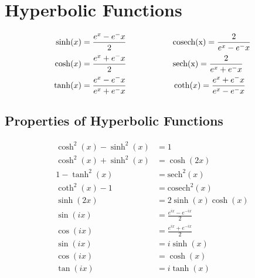 \section{Hyperbolic Functions}
\begin{align*}
\sinh(x) &= \frac{e^x - e^-x}{2} \hspace{20mm} \mathrm{cosech(x)} = \frac{2}{e^x - e^-x}\\
\cosh(x) &= \frac{e^x + e^-x}{2} \hspace{20mm} \mathrm{sech(x)} = \frac{2}{e^x + e^-x}\\
\tanh(x) &= \frac{e^x - e^-x}{e^x + e^-x} \hspace{20mm} \coth(x) = \frac{e^x + e^-x}{e^x - e^-x}
\end{align*}

\subsection{Properties of Hyperbolic Functions}
\begin{align*}
\cosh^2(x) - \sinh^2(x) &= 1\\
\cosh^2(x) + \sinh^2(x) &= \cosh(2x)\\
1 - \tanh^2(x) &= \mathrm{sech}^2(x)\\
\coth^2(x) - 1 &= \mathrm{cosech}^2(x)\\
\sinh(2x) &= 2\sinh(x)\cosh(x)\\
\sin(ix) &= \frac{e^{ix} - e^{-ix}}{2}\\
\cos(ix) &= \frac{e^{ix} + e^{-ix}}{2}\\
\sin(ix) &= i\sinh(x)\\
\cos(ix) &= \cosh(x)\\
\tan(ix) &= i\tanh(x)
\end{align*}
